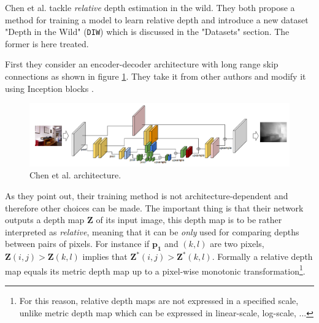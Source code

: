 Chen et al. \cite{DIW} tackle \textit{relative} depth estimation in the wild.
They both propose a method for training a model to learn relative depth and introduce a new dataset "Depth in the Wild" (\texttt{DIW}) which is discussed in the "Datasets" section.
The former is here treated.

First they consider an encoder-decoder architecture with long range skip connections as shown in figure \ref{fig:DIW_architecture}.
They take it from other authors and modify it using Inception blocks \cite{Inception}.

\begin{figure}
\centering
\includegraphics[scale=0.4]{figs/DIW_architecture}
\caption{Chen et al. \cite{DIW} architecture. \label{fig:DIW_architecture}}
\end{figure}

As they point out, their training method is not architecture-dependent and therefore other choices can be made.
The important thing is that their network outputs a depth map $\mathbf{Z}$ of its input image, this depth map is to be rather interpreted as \textit{relative}, meaning that it can be \textit{only} used for comparing depths between pairs of pixels.
For instance if $\mathbf{p_{1}}$ and $(k,l)$ are two pixels, $\mathbf{Z}(i, j) > \mathbf{Z}(k,l)$ implies that $\mathbf{Z}^{*}(i, j) > \mathbf{Z}^{*}(k,l)$.
Formally a relative depth map equals its metric depth map up to a pixel-wise monotonic transformation\footnote{For this reason, relative depth maps are not expressed in a specified scale, unlike metric depth map which can be expressed in linear-scale, log-scale, ...}.

